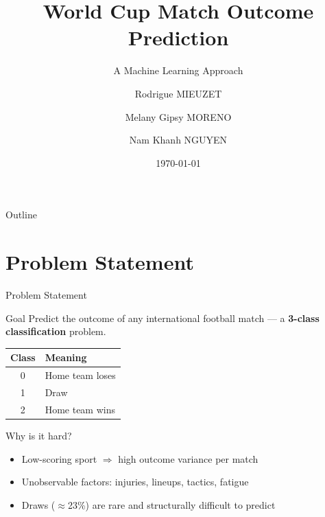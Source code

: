 \documentclass[10pt,aspectratio=169]{beamer}
\title[WC Match Outcome Prediction]{World Cup Match Outcome Prediction}
\subtitle{A Machine Learning Approach}
\author{Rodrigue MIEUZET \and Melany Gipsy MORENO \and Nam Khanh NGUYEN}
\institute{Machine Learning --- Final Project}
\date{\today}
\begin{document}
\begin{frame}
  \titlepage
\end{frame}

\begin{frame}{Outline}
  \tableofcontents
\end{frame}

\section{Problem Statement}

\begin{frame}{Problem Statement}
  \begin{block}{Goal}
    Predict the outcome of any international football match ---
    a \textbf{3-class classification} problem.
  \end{block}

  \medskip
  \begin{center}
    \begin{tabular}{cl}
      \toprule
      \textbf{Class} & \textbf{Meaning} \\
      \midrule
      0 & Home team loses \\
      1 & Draw \\
      2 & Home team wins \\
      \bottomrule
    \end{tabular}
  \end{center}

  \medskip
  \begin{alertblock}{Why is it hard?}
    \begin{itemize}
      \item Low-scoring sport $\Rightarrow$ high outcome variance per match
      \item Unobservable factors: injuries, lineups, tactics, fatigue
      \item Draws ($\approx$23\%) are rare and structurally difficult to predict
    \end{itemize}
  \end{alertblock}
\end{frame}
\end{document}
